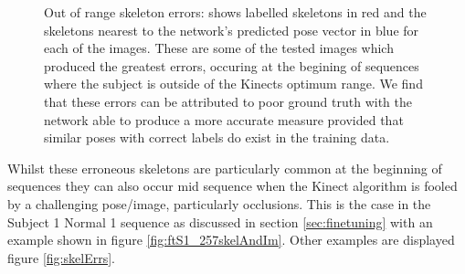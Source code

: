 \documentclass[11pt]{article} %
\begin{document}
\begin{figure}
\qquad%
%
\caption{Out of range skeleton errors: shows labelled skeletons in red and the skeletons nearest to the network's predicted pose vector in blue for each of the images. These are some of the tested images which produced the greatest errors, occuring at the begining of sequences where the subject is outside of the Kinects optimum range. We find that these errors can be attributed to poor ground truth with the network able to produce a more accurate measure provided that similar poses with correct labels do exist in the training data. }
\label{fig:badSkels}
\end{figure}

Whilst these erroneous skeletons are particularly common at the beginning of sequences they can also occur mid sequence when the Kinect algorithm is fooled by a challenging pose/image, particularly occlusions. This is the case in the Subject 1 Normal 1 sequence as discussed in section \ref{sec:finetuning} with an example shown in figure \ref{fig:ftS1_257skelAndIm}. Other examples are displayed figure \ref{fig:skelErrs}.
\end{document}
